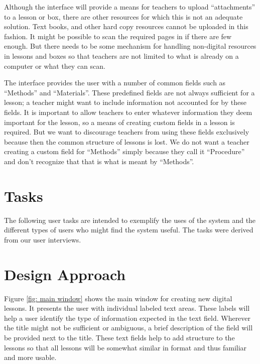 \documentclass[10pt,letter]{article}
\begin{document}
Although the interface will provide a means for teachers to upload
``attachments'' to a lesson or box, there are other resources for which this is
not an adequate solution. Text books, and other hard copy resources cannot be
uploaded in this fashion. It might be possible to scan the required pages in if
there are few enough. But there needs to be some mechanism for handling
non-digital resources in lessons and boxes so that teachers are not limited to
what is already on a computer or what they can scan.

The interface provides the user with a number of common fields such as
``Methods'' and ``Materials''. These predefined fields are not always sufficient
for a lesson; a teacher might want to include information not accounted for by
these fields. It is important to allow teachers to enter whatever information
they deem important for the lesson, so a means of creating custom fields in a
lesson is required. But we want to discourage teachers from using these fields
exclusively because then the common structure of lessons is lost. We do not want
a teacher creating a custom field for ``Methods'' simply because they call it
``Procedure'' and don't recognize that that is what is meant by ``Methods''.

\section{Tasks}
The following user tasks are intended to exemplify the uses of the system and
the different types of users who might find the system useful. The tasks were
derived from our user interviews.



\section{Design Approach}
Figure \ref{fig: main window} shows the main window for creating new digital
lessons. It presents the user with individual labeled text areas. These labels
will help a user identify the type of information expected in the text field.
Wherever the title might not be sufficient or ambiguous, a brief description of
the field will be provided next to the title. These text fields help to add
structure to the lessons so that all lessons will be somewhat similar in format
and thus familiar and more usable.
\end{document}
